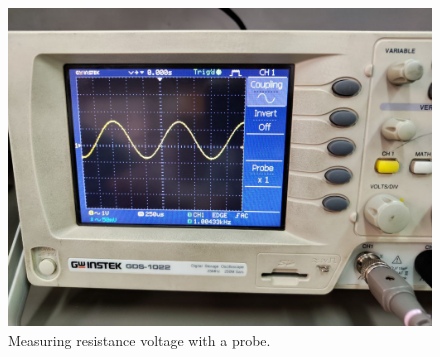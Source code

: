 \documentclass[11pt]{article}
\newcommand{\PicScale}{0.2}
\begin{document}
\begin{question}
{        \begin{figure}[H]
            \begin{center}
                \includegraphics[scale=\PicScale]{Fig/34.jpeg}
                \caption{Measuring resistance voltage with a probe.}
            \end{center}
        \end{figure}
    }

\end{question}

\end{document}
